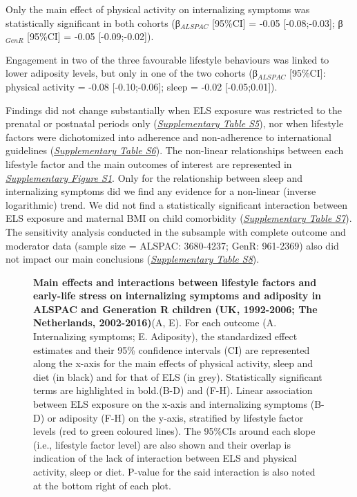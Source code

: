 \documentclass[
  letterpaper,
  DIV=11,
  numbers=noendperiod]{scrreport}
\begin{document}
Only the main effect of physical activity on internalizing symptoms was
statistically significant in both cohorts (β\emph{\(_{ALSPAC}\)}
{[}95\%CI{]} = -0.05 {[}-0.08;-0.03{]}; β\emph{\(_{GenR}\)} {[}95\%CI{]}
= -0.05 {[}-0.09;-0.02{]}).

Engagement in two of the three favourable lifestyle behaviours was
linked to lower adiposity levels, but only in one of the two cohorts
(β\emph{\(_{ALSPAC}\)} {[}95\%CI{]}: physical activity = -0.08
{[}-0.10;-0.06{]}; sleep = -0.02 {[}-0.05;0.01{]}).

Findings did not change substantially when ELS exposure was restricted
to the prenatal or postnatal periods only
(\href{https://osf.io/x9g6b}{\emph{Supplementary Table S5}}), nor when
lifestyle factors were dichotomized into adherence and non-adherence to
international guidelines
(\href{https://osf.io/x9g6b}{\emph{Supplementary Table S6}}). The
non-linear relationships between each lifestyle factor and the main
outcomes of interest are represented in
\href{https://osf.io/9vky4}{\emph{Supplementary Figure S1}}. Only for
the relationship between sleep and internalizing symptoms did we find
any evidence for a non-linear (inverse logarithmic) trend. We did not
find a statistically significant interaction between ELS exposure and
maternal BMI on child comorbidity
(\href{https://osf.io/x9g6b}{\emph{Supplementary Table S7}}). The
sensitivity analysis conducted in the subsample with complete outcome
and moderator data (sample size = ALSPAC: 3680-4237; GenR: 961-2369)
also did not impact our main conclusions
(\href{https://osf.io/x9g6b}{\emph{Supplementary Table S8}}).

\begin{figure}[H]


\caption{\label{fig-3.3}\textbf{Main effects and interactions between
lifestyle factors and early-life stress on internalizing symptoms and
adiposity in ALSPAC and Generation R children (UK, 1992-2006; The
Netherlands, 2002-2016)}\newline(A, E). For each outcome (A.
Internalizing symptoms; E. Adiposity), the standardized effect estimates
and their 95\% confidence intervals (CI) are represented along the
x-axis for the main effects of physical activity, sleep and diet (in
black) and for that of ELS (in grey). Statistically significant terms
are highlighted in bold.\newline(B-D) and (F-H). Linear association
between ELS exposure on the x-axis and internalizing symptoms (B-D) or
adiposity (F-H) on the y-axis, stratified by lifestyle factor levels
(red to green coloured lines). The 95\%CIs around each slope (i.e.,
lifestyle factor level) are also shown and their overlap is indication
of the lack of interaction between ELS and physical activity, sleep or
diet. P-value for the said interaction is also noted at the bottom right
of each plot.}

\end{figure}%
\end{document}
